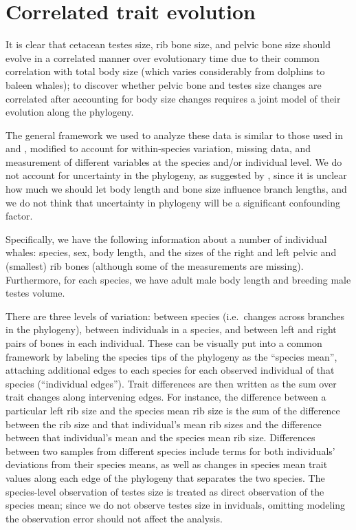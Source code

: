 \documentclass{article}
\begin{document}
\section{Correlated trait evolution}

It is clear that cetacean testes size, rib bone size, and pelvic bone size
should evolve in a correlated manner over evolutionary time
due to their common correlation with total body size 
(which varies considerably from dolphins to baleen whales);
to discover whether pelvic bone and testes size changes are correlated
after accounting for body size changes
requires a joint model of their evolution along the phylogeny.

The general framework we used to analyze these data is similar to those used in \citet{revell2009phylogenetic} and \citet{harmon2008geiger},
modified to account for within-species variation,
missing data,
and measurement of different variables at the species and/or individual level.
We do not account for uncertainty in the phylogeny,
as suggested by \citet{huelsenbeck2003detecting},
since it is unclear how much we should let body length and bone size influence branch lengths,
and we do not think that uncertainty in phylogeny will be a significant confounding factor.

Specifically, we have the following information about a number of individual whales:
species, sex, body length,
and the sizes of the right and left pelvic and (smallest) rib bones
(although some of the measurements are missing).
Furthermore, for each species, we have
adult male body length and
breeding male testes volume.

There are three levels of variation:
between species (i.e.\ changes across branches in the phylogeny),
between individuals in a species,
and between left and right pairs of bones in each individual.
These can be visually put into a common framework by 
labeling the species tips of the phylogeny as the ``species mean'',
attaching additional edges to each species for each observed individual of that species (``individual edges'').
Trait differences are then written as the sum over trait changes along intervening edges.
For instance, the difference between a particular left rib size and the species mean rib size
is the sum of the difference between the rib size and that individual's mean rib sizes 
and the difference between that individual's mean and the species mean rib size.
Differences between two samples from different species include terms for both individuals' deviations from their species means,
as well as changes in species mean trait values along each edge of the phylogeny that separates the two species.
The species-level observation of testes size is treated as direct observation of the species mean;
since we do not observe testes size in inviduals, omitting modeling the observation error should not affect the analysis.
\end{document}
